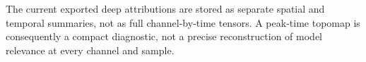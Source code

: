 \documentclass[11pt,a4paper,chapterprefix=false,parskip=false]{scrreprt}
\newcommand{\atc}[1]{\textcolor{red}{#1}}
\begin{document}
The current exported deep attributions are stored as separate spatial and temporal summaries, not as full channel-by-time tensors. A peak-time topomap is consequently a compact diagnostic, not a precise reconstruction of model relevance at every channel and sample.







\end{document}
